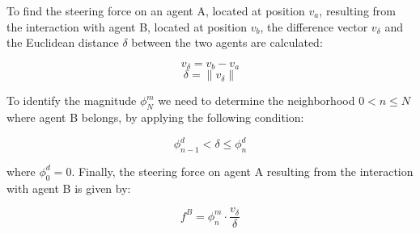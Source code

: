 \documentclass[a4paper]{llncs}
\begin{document}
To find the steering force on an agent A, located at position $v_a$, resulting from the interaction with agent B, located at position $v_b$, the difference vector $v_\delta$ and the Euclidean distance $\delta$ between the two agents are calculated:
\begin{small}
\begin{equation}
	\label{eq:v_delta}
	v_\delta=v_b-v_a
\end{equation}
\begin{equation}
	\label{eq:delta}
	\delta=\|v_\delta\|
\end{equation}
\end{small}
To identify the magnitude $\phi^m_N$ we need to determine the neighborhood $0<n\leq N$ where agent B belongs, by applying the following condition:
\begin{small}
\begin{equation}
	\label{eq:neighborhood}
	\phi^d_{n-1} < \delta \leq \phi^d_{n}
\end{equation}
\end{small}
where $\phi^d_0 = 0$. Finally, the steering force on agent A resulting from the interaction with agent B is given by:
\begin{small}
\begin{equation}
	\label{eq:force}
	f^{B} = \phi^m_n \cdot \frac{v_\delta}{\delta}
\end{equation}
\end{small}




\end{document}
